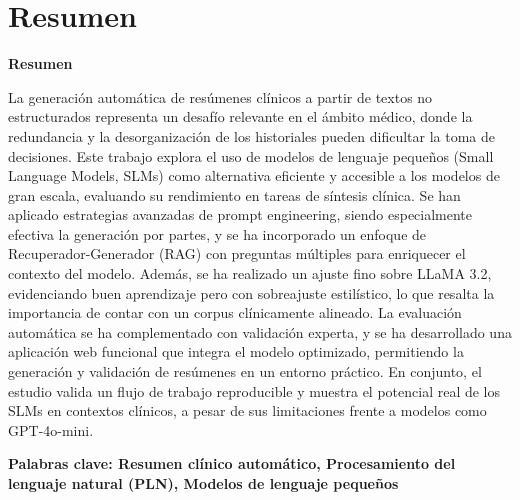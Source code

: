 \documentclass[../main.tex]{subfiles}
\begin{document}
	\makeatletter
	\renewenvironment{abstract}{%
		\if@twocolumn
		\section*{Resumen \\}%
		\else %
		\begin{flushright}
			{\filleft\Huge\bfseries\fontsize{48pt}{12}\selectfont Resumen\vspace{\z@}}%
		\end{flushright}
		\quotation
		\fi}
	{\if@twocolumn\else\endquotation\fi}
	\makeatother
	\makeatletter
	\renewenvironment{abstract}{%
		\if@twocolumn
		\section*{Resumen \\}%
		\else %
		\begin{flushright}
			{\filleft\Huge\bfseries\fontsize{48pt}{12}\selectfont Resumen\vspace{\z@}}%
		\end{flushright}
		\quotation
		\fi}
	{\if@twocolumn\else\endquotation\fi}
	\makeatother
	\begin{abstract}
		La generación automática de resúmenes clínicos a partir de textos no estructurados representa un desafío relevante en el ámbito médico, donde la redundancia y la desorganización de los historiales pueden dificultar la toma de decisiones. Este trabajo explora el uso de modelos de lenguaje pequeños (Small Language Models, SLMs) como alternativa eficiente y accesible a los modelos de gran escala, evaluando su rendimiento en tareas de síntesis clínica. Se han aplicado estrategias avanzadas de prompt engineering, siendo especialmente efectiva la generación por partes, y se ha incorporado un enfoque de Recuperador-Generador (RAG) con preguntas múltiples para enriquecer el contexto del modelo. Además, se ha realizado un ajuste fino sobre LLaMA 3.2, evidenciando buen aprendizaje pero con sobreajuste estilístico, lo que resalta la importancia de contar con un corpus clínicamente alineado. La evaluación automática se ha complementado con validación experta, y se ha desarrollado una aplicación web funcional que integra el modelo optimizado, permitiendo la generación y validación de resúmenes en un entorno práctico. En conjunto, el estudio valida un flujo de trabajo reproducible y muestra el potencial real de los SLMs en contextos clínicos, a pesar de sus limitaciones frente a modelos como GPT-4o-mini.
		
		\bfseries{\large{Palabras clave:}} Resumen clínico automático, Procesamiento del lenguaje natural (PLN), Modelos de lenguaje pequeños
		
	\end{abstract}
\end{document}
